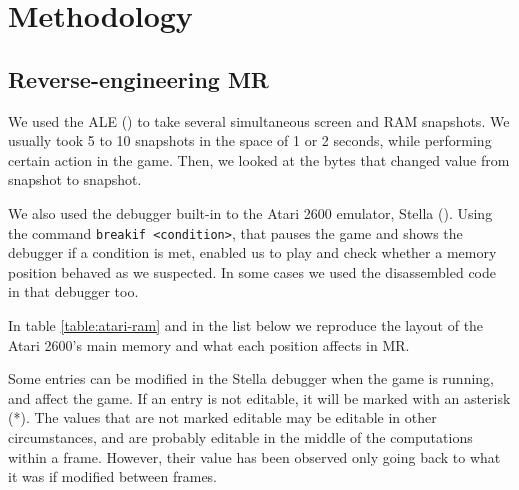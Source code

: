 \chapter{Methodology}
\section{Reverse-engineering \acl{MR}}
We used the \acl{ALE} (\cite{bellemare2013arcade}) to take several simultaneous
screen and \ac{RAM} snapshots. We usually took 5 to 10 snapshots in the space of
1 or 2 seconds, while performing certain action in the game. Then, we looked at
the bytes that changed value from snapshot to snapshot.

We also used the debugger built-in to the Atari 2600 emulator, Stella
(\cite{stella}). Using the command \verb-breakif <condition>-, that pauses the
game and shows the debugger if a condition is met, enabled us to play and check
whether a memory position behaved as we suspected. In some cases we used the
disassembled code in that debugger too.

In table \ref{table:atari-ram} and in the list below we reproduce the layout of
the Atari 2600's main memory and what each position affects in \acl{MR}.

Some entries can be modified in the Stella debugger when the game is running,
and affect the game. If an entry is not editable, it will be marked with an
asterisk (*). The values that are not marked editable may be editable in other
circumstances, and are probably editable in the middle of the computations
within a frame. However, their value has been observed only going back to what
it was if modified between frames.




